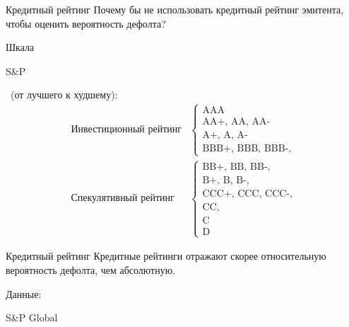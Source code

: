 \documentclass{beamer}
\newcommand{\en}[1]{\begin{otherlanguage}{english}#1\end{otherlanguage}}
\begin{document}
\begin{frame}{Кредитный рейтинг}
\justify
Почему бы не использовать кредитный рейтинг эмитента, чтобы оценить вероятность дефолта?

\justify
Шкала \en{S\&P}\ (от лучшего к худшему):
\begin{align*}
\text{Инвестиционный рейтинг}
&\begin{cases}
\text{AAA} \\
\text{AA+, AA, AA-} \\
\text{A+, A, A-} \\
\text{BBB+, BBB, BBB-,}
\end{cases} \\
\text{Спекулятивный рейтинг}
&\begin{cases}
\text{BB+, BB, BB-,} \\
\text{B+, B, B-,} \\
\text{CCC+, CCC, CCC-,} \\
\text{CC,} \\
\text{C} \\
\text{D}
\end{cases}
\end{align*}
\end{frame}



\newcommand{\addDefaultRatePlot}[3] {

	\addplot[
		color = #2,
		mark = #3,
		thick
	]
	table[
		x = year,
		y = #1,
		col sep = comma
	]
	{sp_2020_global_corporate_default_rates.csv};
}

\begin{frame}{Кредитный рейтинг}
\justify
Кредитные рейтинги отражают скорее относительную вероятность дефолта, чем абсолютную.

\justify
\centering
{}

\centering
\small Данные: \en{S\&P Global}
\end{frame}
\end{document}
